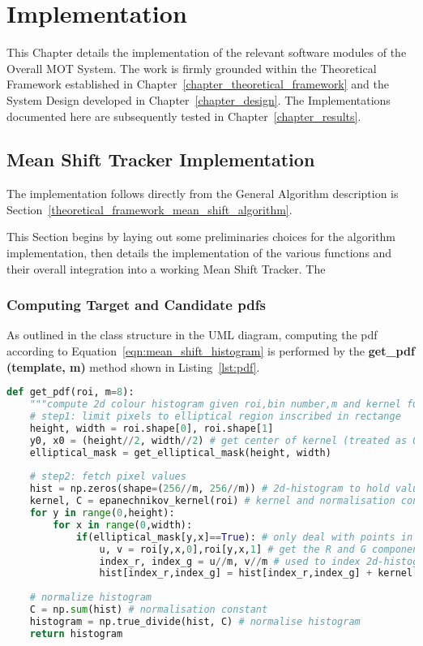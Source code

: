 \chapter{Implementation}\label{chapter_implementation}

This Chapter details the implementation of the relevant software modules of the
Overall MOT System. The work is firmly grounded within the Theoretical Framework
established in Chapter~\ref{chapter_theoretical_framework} and the System Design
developed in Chapter~\ref{chapter_design}. The Implementations documented here
are subsequently tested in Chapter~\ref{chapter_results}.

\section{Mean Shift Tracker Implementation}\label{implementation_mean_shift_tracker}
The implementation follows directly from the General Algorithm description is
Section~\ref{theoretical_framework_mean_shift_algorithm}.

This Section begins by laying out some preliminaries choices for the algorithm
implementation, then details the implementation of the various functions and
their overall integration into a working Mean Shift Tracker. The  

\subsection{Computing Target and Candidate pdfs}
As outlined in the class structure in the UML diagram, %
computing the pdf according to Equation~\ref{eqn:mean_shift_histogram} is
performed by the \textbf{get\_pdf (template, m)} method shown in
Listing~\ref{lst:pdf}.

\begin{lstlisting}[language=Python, caption={Computing pdf}, captionpos=b, label={lst:pdf}]
def get_pdf(roi, m=8):
    """compute 2d colour histogram given roi,bin number,m and kernel function"""
    # step1: limit pixels to elliptical region inscribed in rectange
    height, width = roi.shape[0], roi.shape[1]
    y0, x0 = (height//2, width//2) # get center of kernel (treated as 0,0) - note these are also hy and hx 
    elliptical_mask = get_elliptical_mask(height, width)
       
    # step2: fetch pixel values
    hist = np.zeros(shape=(256//m, 256//m)) # 2d-histogram to hold values 
    kernel, C = epanechnikov_kernel(roi) # kernel and normalisation constant, C
    for y in range(0,height):
        for x in range(0,width): 
            if(elliptical_mask[y,x]==True): # only deal with points in the mask
                u, v = roi[y,x,0],roi[y,x,1] # get the R and G components
                index_r, index_g = u//m, v//m # used to index 2d-histogram
                hist[index_r,index_g] = hist[index_r,index_g] + kernel[y,x] # add point to histogram with weight
    
    # normalize histogram
    C = np.sum(hist) # normalisation constant
    histogram = np.true_divide(hist, C) # normalise histogram
    return histogram
\end{lstlisting}

